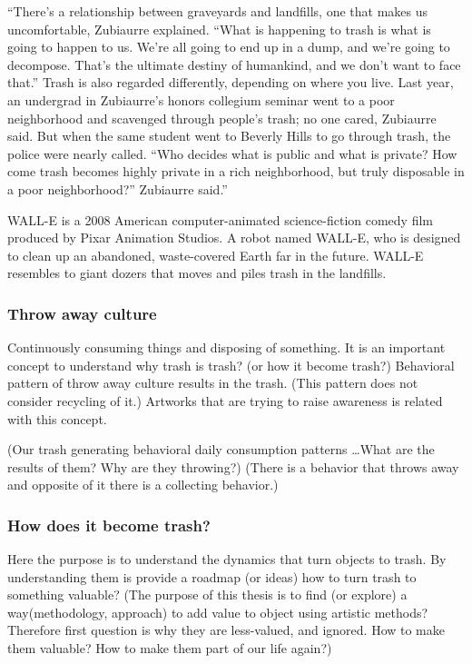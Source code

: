 \documentclass[12pt]{article}
\providecommand{\quotes}[1]{``#1''}
\begin{document}
\quotes{There’s a relationship between graveyards and landfills, one that makes us uncomfortable, Zubiaurre explained. \quotes{What is happening to trash is what is going to happen to us. We’re all going to end up in a dump, and we’re going to decompose. That’s the ultimate destiny of humankind, and we don’t want to face that.} Trash is also regarded differently, depending on where you live. Last year, an undergrad in Zubiaurre’s honors collegium seminar went to a poor neighborhood and scavenged through people’s trash; no one cared, Zubiaurre said. But when the same student went to Beverly Hills to go through trash, the police were nearly called. \quotes{Who decides what is public and what is private? How come trash becomes highly private in a rich neighborhood, but truly disposable in a poor neighborhood?} Zubiaurre said.} \cite{}

WALL-E is a 2008 American computer-animated science-fiction comedy film produced by Pixar Animation Studios. A robot named WALL-E, who is designed to clean up an abandoned, waste-covered Earth far in the future. WALL-E resembles to giant dozers that moves and piles trash in the landfills. 

%
\subsubsection{Throw away culture}
Continuously consuming things and disposing of something. It is an important concept to understand why trash is trash? (or how it become trash?) Behavioral pattern of throw away culture results in the trash. (This pattern does not consider recycling of it.) Artworks that are trying to raise awareness is related with this concept.

(Our trash generating behavioral daily consumption patterns \ldots What are the results of them? Why are they throwing?) (There is a behavior that throws away and opposite of it there is a collecting behavior.) 

%
\subsubsection{How does it become trash?}
Here the purpose is to understand the dynamics that turn objects to trash. By understanding them is provide a roadmap (or ideas) how to turn trash to something valuable? (The purpose of this thesis is to find (or explore) a way(methodology, approach) to add value to object using artistic methods? Therefore first question is why they are less-valued, and ignored. How to make them valuable? How to make them part of our life again?)
\end{document}
